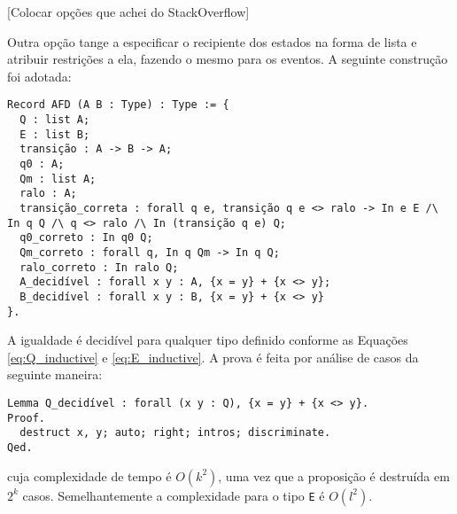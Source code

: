 [Colocar opções que achei do StackOverflow]

Outra opção tange a especificar o recipiente dos estados na forma de lista e atribuir restrições a ela, fazendo o mesmo para os eventos. A seguinte construção foi adotada:

\begin{verbatim}
Record AFD (A B : Type) : Type := {
  Q : list A;
  E : list B;
  transição : A -> B -> A;
  q0 : A;
  Qm : list A;
  ralo : A;
  transição_correta : forall q e, transição q e <> ralo -> In e E /\ In q Q /\ q <> ralo /\ In (transição q e) Q;
  q0_correto : In q0 Q;
  Qm_correto : forall q, In q Qm -> In q Q;
  ralo_correto : In ralo Q;
  A_decidível : forall x y : A, {x = y} + {x <> y};
  B_decidível : forall x y : B, {x = y} + {x <> y}
}.
\end{verbatim}

A igualdade é decidível para qualquer tipo definido conforme as Equações \ref{eq:Q_inductive} e \ref{eq:E_inductive}. A prova é feita por análise de casos da seguinte maneira:

\begin{verbatim}
Lemma Q_decidível : forall (x y : Q), {x = y} + {x <> y}.
Proof.
  destruct x, y; auto; right; intros; discriminate.
Qed.
\end{verbatim}

\noindent
cuja complexidade de tempo é $O(k^2)$, uma vez que a proposição é destruída em $2^k$ casos. Semelhantemente a complexidade para o tipo \texttt{E} é $O(l^2)$.

